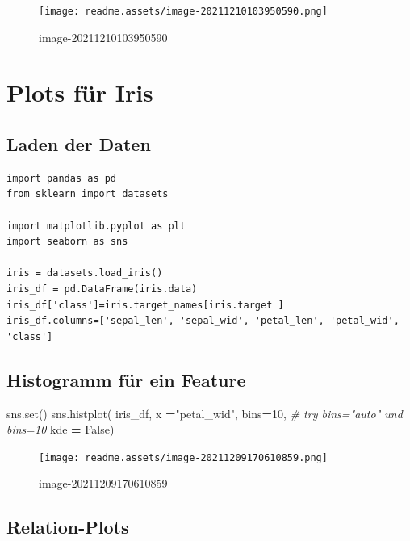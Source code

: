 \documentclass[
  oneside]{book}
\newenvironment{Shaded}{\begin{snugshade}}{\end{snugshade}}
\newcommand{\BuiltInTok}[1]{#1}
\newcommand{\CommentTok}[1]{\textcolor[rgb]{0.56,0.35,0.01}{\textit{#1}}}
\newcommand{\DecValTok}[1]{\textcolor[rgb]{0.00,0.00,0.81}{#1}}
\newcommand{\NormalTok}[1]{#1}
\newcommand{\OperatorTok}[1]{\textcolor[rgb]{0.81,0.36,0.00}{\textbf{#1}}}
\newcommand{\StringTok}[1]{\textcolor[rgb]{0.31,0.60,0.02}{#1}}
\newcommand{\VariableTok}[1]{\textcolor[rgb]{0.00,0.00,0.00}{#1}}
\begin{document}
\begin{figure}
\centering
\texttt{[image: readme.assets/image-20211210103950590.png]}
\caption{image-20211210103950590}
\end{figure}

\hypertarget{plots-fuxfcr-iris}{%
\chapter{Plots für Iris}\label{plots-fuxfcr-iris}}

\hypertarget{laden-der-daten}{%
\section{Laden der Daten}\label{laden-der-daten}}

\begin{verbatim}
import pandas as pd
from sklearn import datasets

import matplotlib.pyplot as plt
import seaborn as sns

iris = datasets.load_iris()
iris_df = pd.DataFrame(iris.data)
iris_df['class']=iris.target_names[iris.target ]
iris_df.columns=['sepal_len', 'sepal_wid', 'petal_len', 'petal_wid', 'class']
\end{verbatim}

\hypertarget{histogramm-fuxfcr-ein-feature}{%
\section{Histogramm für ein Feature}\label{histogramm-fuxfcr-ein-feature}}

\begin{Shaded}
\begin{Highlighting}[]
\NormalTok{sns.}\BuiltInTok{set}\NormalTok{()}
\NormalTok{sns.histplot( iris\_df, }
\NormalTok{             x }\OperatorTok{=}\StringTok{"petal\_wid"}\NormalTok{, }
\NormalTok{             bins}\OperatorTok{=}\DecValTok{10}\NormalTok{,  }\CommentTok{\# try bins="auto" und bins=10}
\NormalTok{             kde }\OperatorTok{=} \VariableTok{False}\NormalTok{)}
\end{Highlighting}
\end{Shaded}

\begin{figure}
\centering
\texttt{[image: readme.assets/image-20211209170610859.png]}
\caption{image-20211209170610859}
\end{figure}

\hypertarget{relation-plots}{%
\section{Relation-Plots}\label{relation-plots}}
\end{document}
